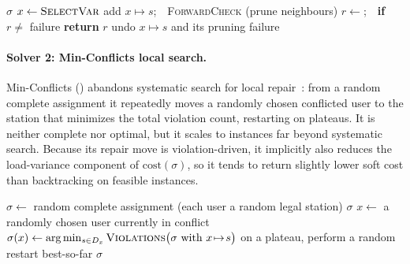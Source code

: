 \documentclass{ai-lab-report}
\begin{document}
\begin{algorithm}[H]
\caption{Backtracking search with MRV\,+\,degree\,+\,LCV\,+\,forward checking.}
\label{alg:backtrack}
\begin{algorithmic}[1]
   \Return $\sigma$
  \EndIf
  \State $x\gets\textsc{SelectVar}$ 
   
      \State add $x\!\mapsto\!s$;\ \ \textsc{ForwardCheck} (prune neighbours)
        \State $r\gets$;\ \ \textbf{if} $r\neq$ failure \textbf{return} $r$
      \EndIf
      \State undo $x\!\mapsto\!s$ and its pruning 
    \EndIf
  \EndFor
  \State \Return failure
\EndFunction
\end{algorithmic}
\end{algorithm}

\paragraph{Solver 2: Min-Conflicts local search.}
Min-Conflicts () abandons systematic search for local repair~\citep{minton1992minconflicts}: from a random complete assignment it repeatedly moves a randomly chosen conflicted user to the station that minimizes the total violation count, restarting on plateaus. It is neither complete nor optimal, 
but it scales to instances far beyond systematic search. Because its repair move is violation-driven, it implicitly also reduces the load-variance component of $\mathrm{cost}(\sigma)$, so it tends to return slightly lower soft cost than backtracking on feasible instances.

\begin{algorithm}[H]
\caption{Min-Conflicts local search (with random restart).}
\label{alg:minconflicts}
\begin{algorithmic}[1]
\State $\sigma\gets$ random complete assignment (each user a random legal station)
   \Return $\sigma$
  \EndIf
  \State $x\gets$ a randomly chosen user currently in conflict
  \State $\sigma(x)\gets\arg\min_{s\in D_x}\textsc{Violations}\big(\sigma\ \text{with}\ x\!\mapsto\!s\big)$ 
  \State on a plateau, perform a random restart
\EndFor
\State \Return best-so-far $\sigma$
\end{algorithmic}
\end{algorithm}
\end{document}
